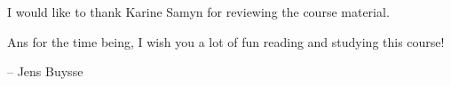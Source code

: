 I would like to thank Karine Samyn for reviewing the course material. 

Ans for the time being, I wish you a lot of fun reading and studying this course!

\begin{flushright}
	-- Jens Buysse
\end{flushright}